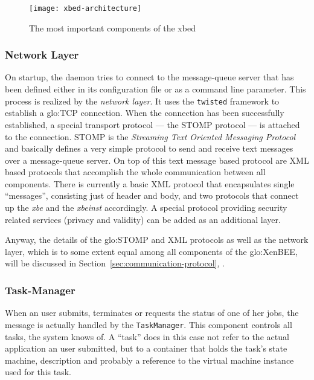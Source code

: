 \begin{figure}[ht]
  \centering
  \texttt{[image: xbed-architecture]}
  \caption[Components of the xbed]{The most important components of the xbed}
  \label{fig:xbed-architecture}
\end{figure}

\subsubsection{Network Layer}

On startup, the  daemon tries to connect to  the message-queue server that
has been  defined either in  its configuration file  or as a  command line
parameter. This process  is realized by the \emph{network  layer}. It uses
the  \texttt{twisted} framework to  establish a  \gls{glo:TCP} connection.
When the connection has been successfully established, a special transport
protocol --- the  STOMP protocol --- is attached  to the connection. STOMP
is  the \emph{Streaming  Text Oriented  Messaging Protocol}  and basically
defines a  very simple protocol to  send and receive text  messages over a
message-queue server.  On top of  this text message based protocol are XML
based  protocols  that  accomplish  the whole  communication  between  all
components.   There is currently  a basic  XML protocol  that encapsulates
single ``messages'', consisting just of header and body, and two protocols
that  connect up  the \emph{xbe}  and the  \emph{xbeinst}  accordingly.  A
special  protocol providing  security  related services  (\ie privacy  and
validity) can be added as an additional layer.

Anyway, the  details of the \gls{glo:STOMP}  and XML protocols  as well as
the network layer,  which is to some extent equal  among all components of
the        \gls{glo:XenBEE},       will       be        discussed       in
Section~\ref{sec:communication-protocol},
\emph{}.

\subsubsection{Task-Manager}

When an  user submits,  terminates or  requests the status  of one  of her
jobs, the  message is actually handled by  the \texttt{TaskManager}.  This
component controls all tasks, the system knows of. A ``task'' does in this
case  not refer  to the  actual application  an user  submitted, but  to a
container that holds the task's  state machine, description and probably a
reference to the virtual machine instance used for this task.

